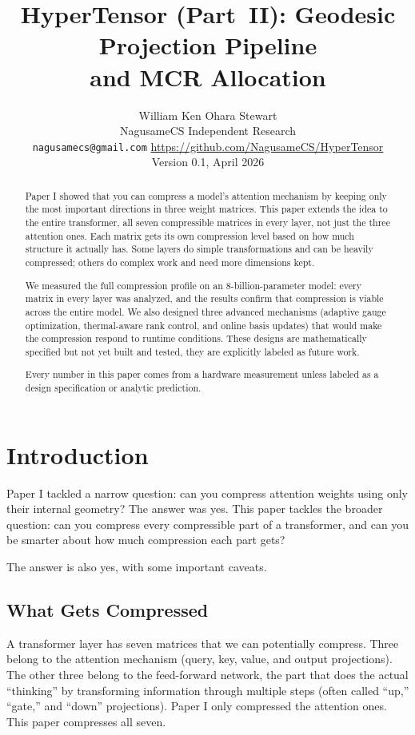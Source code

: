 \documentclass[11pt]{article}
\title{HyperTensor (Part~II): Geodesic Projection Pipeline\\and MCR Allocation}
\author{William Ken Ohara Stewart\\
\small NagusameCS Independent Research\\
\small \texttt{nagusamecs@gmail.com} \quad \url{https://github.com/NagusameCS/HyperTensor}\\
\small Version 0.1, April 2026}
\date{}
\begin{document}
\maketitle

\begin{abstract}
\noindent
Paper I showed that you can compress a model's attention mechanism by keeping
only the most important directions in three weight matrices. This paper extends
the idea to the entire transformer, all seven compressible matrices
in every layer, not just the three attention ones. Each matrix gets its own
compression level based on how much structure it actually has. Some layers do
simple transformations and can be heavily compressed; others do complex work
and need more dimensions kept.

We measured the full compression profile on an 8-billion-parameter model:
every matrix in every layer was analyzed, and the results confirm that
compression is viable across the entire model. We also designed three
advanced mechanisms (adaptive gauge optimization, thermal-aware rank control,
and online basis updates) that would make the compression respond to runtime
conditions. These designs are mathematically specified but not yet built and
tested, they are explicitly labeled as future work.

Every number in this paper comes from a hardware measurement unless labeled
as a design specification or analytic prediction.
\end{abstract}

\section{Introduction}

Paper I tackled a narrow question: can you compress attention weights using
only their internal geometry? The answer was yes. This paper tackles the
broader question: can you compress every compressible part of a
transformer, and can you be smarter about how much compression each part
gets?

The answer is also yes, with some important caveats.

\subsection{What Gets Compressed}

A transformer layer has seven matrices that we can potentially compress. Three
belong to the attention mechanism (query, key, value, and output projections).
The other three belong to the feed-forward network, the part that does the
actual ``thinking'' by transforming information through multiple steps (often
called ``up,'' ``gate,'' and ``down'' projections). Paper I only compressed the
attention ones. This paper compresses all seven.
\end{document}
